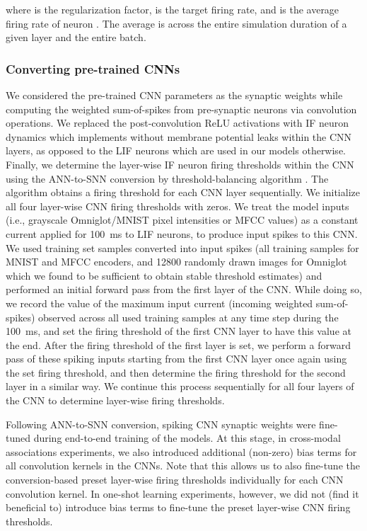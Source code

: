 \documentclass{article}
\begin{document}
where  is the regularization factor,  is the target firing rate, and  is the average firing rate of neuron . The average is across the entire simulation duration of a given layer and the entire batch.

\subsubsection*{Converting pre-trained CNNs}
\label{sec:supp-cnn_conversion}
We considered the pre-trained \gls{CNN} parameters as the synaptic weights while computing the weighted sum-of-spikes from pre-synaptic neurons via convolution operations. We replaced the post-convolution ReLU activations with \gls{IF} neuron dynamics which implements  without membrane potential leaks within the \gls{CNN} layers, as opposed to the \gls{LIF} neurons which are used in our models otherwise. Finally, we determine the layer-wise \gls{IF} neuron firing thresholds within the \gls{CNN} using the ANN-to-SNN conversion by threshold-balancing algorithm \cite{diehl2015fast,sengupta2019going}. The algorithm obtains a firing threshold for each \gls{CNN} layer sequentially. We initialize all four layer-wise \gls{CNN} firing thresholds with zeros. We treat the model inputs (i.e., grayscale Omniglot/MNIST pixel intensities or \gls{MFCC} values) as a constant current applied for \SI{100}{\ms} to \gls{LIF} neurons, to produce input spikes to this \gls{CNN}. We used training set samples converted into input spikes (all training samples for MNIST and \gls{MFCC} encoders, and \num{12800} randomly drawn images for Omniglot which we found to be sufficient to obtain stable threshold estimates) and performed an initial forward pass from the first layer of the \gls{CNN}. While doing so, we record the value of the maximum input current (incoming weighted sum-of-spikes) observed across all used training samples at any time step during the \SI{100}{\ms}, and set the firing threshold of the first \gls{CNN} layer to have this value at the end. After the firing threshold of the first layer is set, we perform a forward pass of these spiking inputs starting from the first \gls{CNN} layer once again using the set firing threshold, and then determine the firing threshold for the second layer in a similar way. We continue this process sequentially for all four layers of the \gls{CNN} to determine layer-wise firing thresholds.

Following ANN-to-SNN conversion, spiking \gls{CNN} synaptic weights were fine-tuned during end-to-end training of the models. At this stage, in cross-modal associations experiments, we also introduced additional (non-zero) bias terms for all convolution kernels in the \glspl{CNN}. Note that this allows us to also fine-tune the conversion-based preset layer-wise firing thresholds individually for each \gls{CNN} convolution kernel. In one-shot learning experiments, however, we did not (find it beneficial to) introduce bias terms to fine-tune the preset layer-wise \gls{CNN} firing thresholds.
\end{document}
